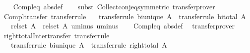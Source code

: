 \begin{isabellebody}
%
\isadelimproof
\ \ %
\endisadelimproof
%
\isatagproof
{}\isamarkupfalse%
\ Compl{\isacharunderscore}{\kern0pt}eq\ {\isacharbrackleft}{\kern0pt}abs{\isacharunderscore}{\kern0pt}def{\isacharbrackright}{\kern0pt}\isanewline
\ \ \isamarkupfalse%
\ {\isacharparenleft}{\kern0pt}subst\ Collect{\isacharunderscore}{\kern0pt}conj{\isacharunderscore}{\kern0pt}eq{\isacharbrackleft}{\kern0pt}symmetric{\isacharbrackright}{\kern0pt}{\isacharparenright}{\kern0pt}\ transfer{\isacharunderscore}{\kern0pt}prover%
\endisatagproof
{\isafoldproof}%
%
\isadelimproof
\isanewline
%
\endisadelimproof
\isanewline
{}\isamarkupfalse%
\ Compl{\isacharunderscore}{\kern0pt}transfer\ {\isacharbrackleft}{\kern0pt}transfer{\isacharunderscore}{\kern0pt}rule{\isacharbrackright}{\kern0pt}{\isacharcolon}{\kern0pt}\isanewline
\ \ \ {\isacharbrackleft}{\kern0pt}transfer{\isacharunderscore}{\kern0pt}rule{\isacharbrackright}{\kern0pt}{\isacharcolon}{\kern0pt}\ {\isachardoublequoteopen}bi{\isacharunderscore}{\kern0pt}unique\ A{\isachardoublequoteclose}\ \ {\isacharbrackleft}{\kern0pt}transfer{\isacharunderscore}{\kern0pt}rule{\isacharbrackright}{\kern0pt}{\isacharcolon}{\kern0pt}\ {\isachardoublequoteopen}bi{\isacharunderscore}{\kern0pt}total\ A{\isachardoublequoteclose}\isanewline
\ \ \ {\isachardoublequoteopen}{\isacharparenleft}{\kern0pt}rel{\isacharunderscore}{\kern0pt}set\ A\ {\isacharequal}{\kern0pt}{\isacharequal}{\kern0pt}{\isacharequal}{\kern0pt}{\isachargreater}{\kern0pt}\ rel{\isacharunderscore}{\kern0pt}set\ A{\isacharparenright}{\kern0pt}\ uminus\ uminus{\isachardoublequoteclose}\isanewline
%
\isadelimproof
\ \ %
\endisadelimproof
%
\isatagproof
{}\isamarkupfalse%
\ Compl{\isacharunderscore}{\kern0pt}eq\ {\isacharbrackleft}{\kern0pt}abs{\isacharunderscore}{\kern0pt}def{\isacharbrackright}{\kern0pt}\ \isamarkupfalse%
\ transfer{\isacharunderscore}{\kern0pt}prover%
\endisatagproof
{\isafoldproof}%
%
\isadelimproof
\isanewline
%
\endisadelimproof
\isanewline
{}\isamarkupfalse%
\ right{\isacharunderscore}{\kern0pt}total{\isacharunderscore}{\kern0pt}Inter{\isacharunderscore}{\kern0pt}transfer\ {\isacharbrackleft}{\kern0pt}transfer{\isacharunderscore}{\kern0pt}rule{\isacharbrackright}{\kern0pt}{\isacharcolon}{\kern0pt}\isanewline
\ \ \ {\isacharbrackleft}{\kern0pt}transfer{\isacharunderscore}{\kern0pt}rule{\isacharbrackright}{\kern0pt}{\isacharcolon}{\kern0pt}\ {\isachardoublequoteopen}bi{\isacharunderscore}{\kern0pt}unique\ A{\isachardoublequoteclose}\ \ {\isacharbrackleft}{\kern0pt}transfer{\isacharunderscore}{\kern0pt}rule{\isacharbrackright}{\kern0pt}{\isacharcolon}{\kern0pt}\ {\isachardoublequoteopen}right{\isacharunderscore}{\kern0pt}total\ A{\isachardoublequoteclose}\isanewline

\end{isabellebody}
